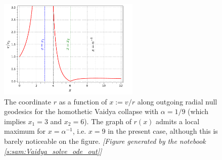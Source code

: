 \begin{figure}
\centerline{\includegraphics[width=0.6\textwidth]{vai_r_x_naksing.pdf}}
\caption[]{\label{f:vai:r_x_naksing} \footnotesize
The coordinate $r$ as a function of $x:=v/r$ along outgoing radial
null geodesics for the homothetic Vaidya collapse with
$\alpha = 1/9$ (which implies $x_1 = 3$ and $x_2 = 6$).
The graph of $r(x)$ admits a local
maximum for $x=\alpha^{-1}$, i.e. $x=9$ in the present case, although this
is barely noticeable on the figure.
\textsl{[Figure generated by the notebook \ref{s:sam:Vaidya_solve_ode_out}]}
}
\end{figure}

